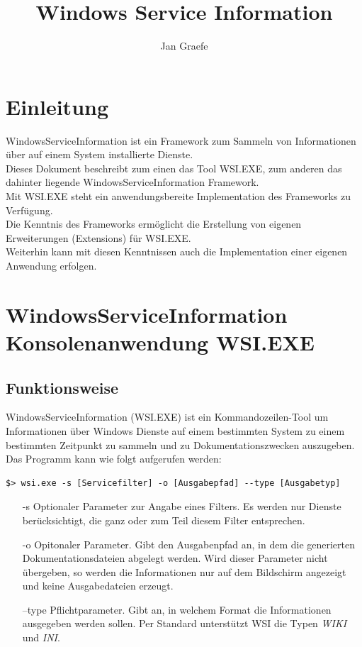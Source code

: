 \documentclass[11pt,DIV=15]{scrreprt}
\title{Windows Service Information}
\author{Jan Graefe}
\begin{document}
\maketitle
\tableofcontents
\chapter{Einleitung}
WindowsServiceInformation ist ein Framework zum Sammeln von Informationen über auf einem System installierte Dienste. \\

Dieses Dokument beschreibt zum einen das Tool WSI.EXE, zum anderen das dahinter liegende WindowsServiceInformation Framework.\\

Mit WSI.EXE steht ein anwendungsbereite Implementation des Frameworks zu Verfügung.\\

Die Kenntnis des Frameworks ermöglicht die Erstellung von eigenen Erweiterungen (Extensions) für WSI.EXE.\\

Weiterhin kann mit diesen Kenntnissen auch die Implementation einer eigenen Anwendung erfolgen.
\chapter{WindowsServiceInformation Konsolenanwendung WSI.EXE}
\section{Funktionsweise}
WindowsServiceInformation (WSI.EXE) ist ein Kommandozeilen-Tool um Informationen über Windows Dienste auf einem bestimmten System zu einem bestimmten Zeitpunkt zu sammeln und zu Dokumentationszwecken auszugeben. \\
Das Programm kann wie folgt aufgerufen werden:
\begin{lstlisting}
$> wsi.exe -s [Servicefilter] -o [Ausgabepfad] --type [Ausgabetyp]
\end{lstlisting}
\begin{itemize}
 \item[-s] Optionaler Parameter zur Angabe eines Filters. Es werden nur Dienste berücksichtigt, die ganz oder zum Teil diesem Filter entsprechen.
 \item[-o] Opitonaler Parameter. Gibt den Ausgabenpfad an, in dem die generierten Dokumentationsdateien abgelegt werden. Wird dieser Parameter nicht übergeben, so werden die Informationen nur auf dem Bildschirm angezeigt und keine Ausgabedateien erzeugt.
 \item[--type] Pflichtparameter. Gibt an, in welchem Format die Informationen ausgegeben werden sollen. Per Standard unterstützt WSI die Typen \emph{WIKI} und \emph{INI}.
\end{itemize}
\end{document}
